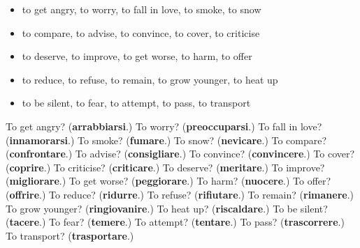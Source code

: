 \begin{itemize}
\raggedright
  \item to get angry, to worry, to fall in love, to smoke, to snow
  \item to compare, to advise, to convince, to cover, to criticise
  \item to deserve, to improve, to get worse, to harm, to offer
  \item to reduce, to refuse, to remain, to grow younger, to heat up
  \item to be silent, to fear, to attempt, to pass, to transport
\end{itemize}

\begin{tcolorbox}[breakable,colback=teal!4,colframe=teal!35!black,title={Before you move on}]
To get angry? (\textbf{arrabbiarsi}.) To worry? (\textbf{preoccuparsi}.) To fall in love? (\textbf{innamorarsi}.) To smoke? (\textbf{fumare}.) To snow? (\textbf{nevicare}.) To compare? (\textbf{confrontare}.) To advise? (\textbf{consigliare}.) To convince? (\textbf{convincere}.) To cover? (\textbf{coprire}.) To criticise? (\textbf{criticare}.) To deserve? (\textbf{meritare}.) To improve? (\textbf{migliorare}.) To get worse? (\textbf{peggiorare}.) To harm? (\textbf{nuocere}.) To offer? (\textbf{offrire}.) To reduce? (\textbf{ridurre}.) To refuse? (\textbf{rifiutare}.) To remain? (\textbf{rimanere}.) To grow younger? (\textbf{ringiovanire}.) To heat up? (\textbf{riscaldare}.) To be silent? (\textbf{tacere}.) To fear? (\textbf{temere}.) To attempt? (\textbf{tentare}.) To pass? (\textbf{trascorrere}.) To transport? (\textbf{trasportare}.)
\end{tcolorbox}
